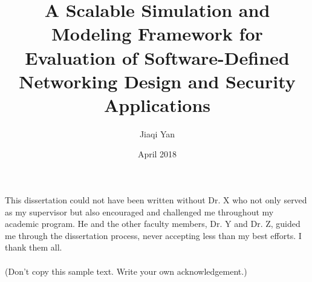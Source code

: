 \documentclass{iitthesis}
\theoremstyle{definition}
\begin{document}
\title{A Scalable Simulation and Modeling Framework for Evaluation of
Software-Defined Networking Design and Security Applications
}
\author{Jiaqi Yan}
\date{April 2018}
\copyrightnoticetrue      %
\maketitle                %


\prelimpages         %


\begin{acknowledgement}     %
\par  This dissertation could not have been written without Dr. X
who not only served as my supervisor but also encouraged and
challenged me throughout my academic program. He and the other
faculty members, Dr. Y and Dr. Z, guided me through the
dissertation process, never accepting less than my best efforts. I
thank them all.\\ \\ (Don't copy this sample text. Write your own
acknowledgement.)
\end{acknowledgement}


\tableofcontents
\clearpage

\listoftables

\clearpage

\listoffigures

\clearpage


\listofsymbols
{}

\clearpage
\end{document}
